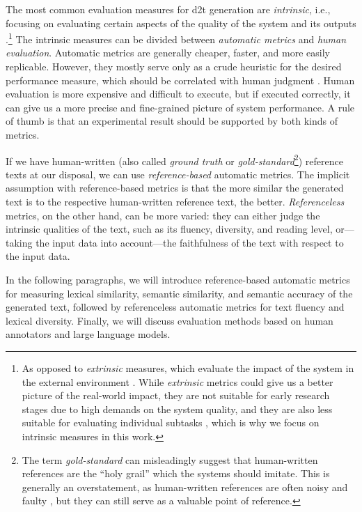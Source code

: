 {The most common evaluation measures for \ac{d2t} generation are \emph{intrinsic}, i.e., focusing on evaluating certain aspects of the quality of the system and its outputs \cite{gkatzia2015snapshot,celikyilmazEvaluationTextGeneration2021}.\footnote{As opposed to \emph{extrinsic} measures, which evaluate the impact of the system in the external environment \cite{celikyilmazEvaluationTextGeneration2021}. While \emph{extrinsic} metrics could give us a better picture of the real-world impact, they are not suitable for early research stages due to high demands on the system quality, and they are also less suitable for evaluating individual subtasks \cite{van2019best}, which is why we focus on intrinsic measures in this work.} The intrinsic measures can be divided between \emph{automatic metrics} and \emph{human evaluation}. Automatic metrics are generally cheaper, faster, and more easily replicable. However, they mostly serve only as a crude heuristic for the desired performance measure, which should be correlated with human judgment \cite{van2019best}. Human evaluation is more expensive and difficult to execute, but if executed correctly, it can give us a more precise and fine-grained picture of system performance. A rule of thumb is that an experimental result should be supported by both kinds of metrics.


If we have human-written (also called \emph{ground truth} or \emph{gold-standard}\footnote{The term \emph{gold-standard} can misleadingly suggest that human-written references are the ``holy grail'' which the systems should imitate. This is generally an overstatement, as human-written references are often noisy and faulty \cite{dusekSemanticNoiseMatters2019,clarkAllThatHuman2021}, but they can still serve as a valuable point of reference.}) reference texts at our disposal, we can use \emph{reference-based}  automatic metrics. The implicit assumption with reference-based metrics is that the more similar the generated text is to the respective human-written reference text, the better. \emph{Referenceless} metrics, on the other hand, can be more varied: they can either judge the intrinsic qualities of the text, such as its fluency, diversity, and reading level, or---taking the input data into account---the faithfulness of the text with respect to the input data. \cite{celikyilmazEvaluationTextGeneration2021}

In the following paragraphs, we will introduce  reference-based automatic metrics for measuring lexical similarity, semantic similarity, and semantic accuracy of the generated text, followed by referenceless automatic metrics for text fluency and lexical diversity. Finally, we will discuss evaluation methods based on human annotators and large language models.


}
